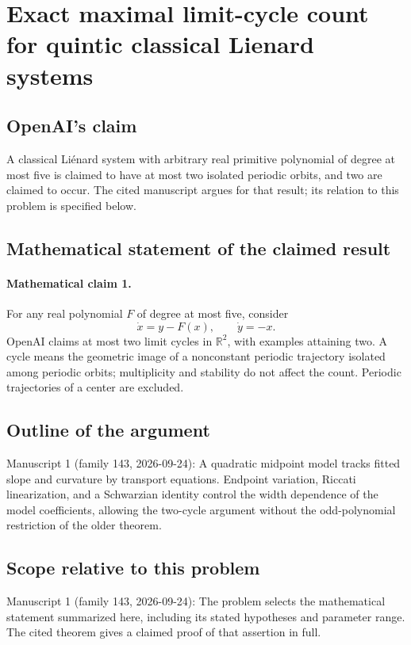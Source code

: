 \documentclass[11pt]{article}
\begin{document}
\section*{Exact maximal limit-cycle count for quintic classical Lienard systems}

\subsection{OpenAI's claim}
A classical Liénard system with arbitrary real primitive polynomial of degree at most five is claimed to have at most two isolated periodic orbits, and two are claimed to occur. The cited manuscript argues for that result; its relation to this problem is specified below.

\subsection{Mathematical statement of the claimed result}
\paragraph{Mathematical claim 1.} For any real polynomial $F$ of degree at most five, consider
\[
\dot x=y-F(x),\qquad\dot y=-x.
\]
OpenAI claims at most two limit cycles in $\mathbb R^2$, with examples attaining two. A cycle means the geometric image of a nonconstant periodic trajectory isolated among periodic orbits; multiplicity and stability do not affect the count. Periodic trajectories of a center are excluded.

\subsection{Outline of the argument}
Manuscript 1 (family 143, 2026-09-24): A quadratic midpoint model tracks fitted slope and curvature by transport equations. Endpoint variation, Riccati linearization, and a Schwarzian identity control the width dependence of the model coefficients, allowing the two-cycle argument without the odd-polynomial restriction of the older theorem.

\subsection{Scope relative to this problem}
Manuscript 1 (family 143, 2026-09-24): The problem selects the mathematical statement summarized here, including its stated hypotheses and parameter range. The cited theorem gives a claimed proof of that assertion in full.
\end{document}
